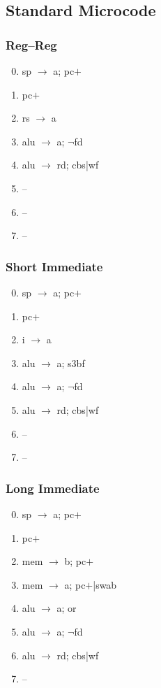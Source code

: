 \documentclass[11pt]{book}
\begin{document}
\subsection*{Standard Microcode}
\begin{multicols}{3}\ttfamily\selectfont\small
  \subsubsection*{Reg--Reg}
  \begin{enumerate}\setcounter{enumi}{-1}
  \item sp \(\rightarrow\) a; pc\(+\)
  \item pc\(+\)
  \item rs \(\rightarrow\) a
  \item alu \(\rightarrow\) a; \(\neg\)fd
  \item alu \(\rightarrow\) rd; cbs|wf
  \item --
  \item --
  \item --
  \end{enumerate}
  \columnbreak
  \subsubsection*{Short Immediate}
  \begin{enumerate}\setcounter{enumi}{-1}
  \item sp \(\rightarrow\) a; pc\(+\)
  \item pc\(+\)
  \item i \(\rightarrow\) a
  \item alu \(\rightarrow\) a; s3bf
  \item alu \(\rightarrow\) a; \(\neg\)fd
  \item alu \(\rightarrow\) rd; cbs|wf
  \item --
  \item --
  \end{enumerate}
  \columnbreak
  \subsubsection*{Long Immediate}
  \begin{enumerate}\setcounter{enumi}{-1}
  \item sp \(\rightarrow\) a; pc\(+\)
  \item pc\(+\)
  \item mem \(\rightarrow\) b; pc\(+\)
  \item mem \(\rightarrow\) a; pc\(+\)|swab
  \item alu \(\rightarrow\) a; or
  \item alu \(\rightarrow\) a; \(\neg\)fd
  \item alu \(\rightarrow\) rd; cbs|wf
  \item --
  \end{enumerate}
\end{multicols}
\end{document}
